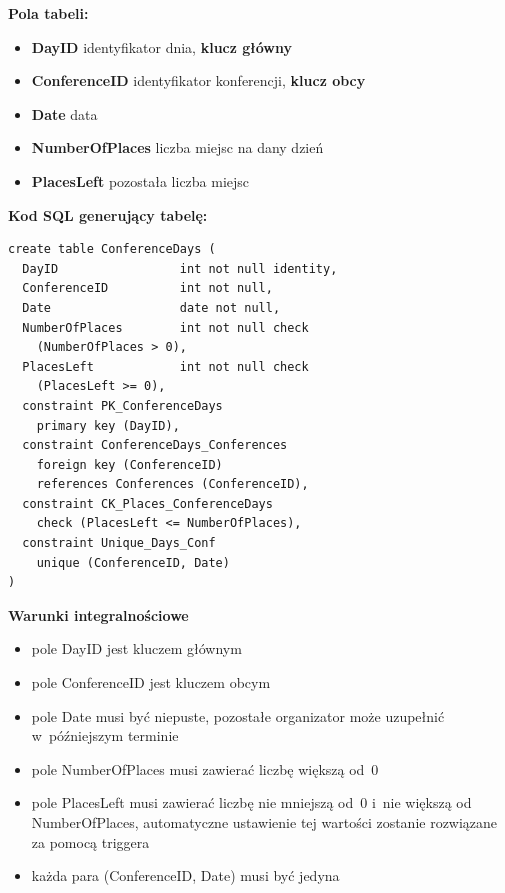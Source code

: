 \documentclass[12pt, a4paper]{mwrep}
\begin{document}
\vspace{0.5cm}

\noindent \textbf{Pola tabeli:}
\begin{itemize}
  \item \textbf{DayID} \ppauza identyfikator dnia, \textbf{klucz główny}
  \item \textbf{ConferenceID} \ppauza identyfikator konferencji, \textbf{klucz obcy}
  \item \textbf{Date} \ppauza data
  \item \textbf{NumberOfPlaces} \ppauza liczba miejsc na dany dzień
  \item \textbf{PlacesLeft} \ppauza pozostała liczba miejsc
\end{itemize}

\vspace{0.5cm}
\noindent \textbf{Kod SQL generujący tabelę:}

\begin{lstlisting}
create table ConferenceDays (
  DayID                 int not null identity,
  ConferenceID          int not null,
  Date                  date not null,
  NumberOfPlaces        int not null check
    (NumberOfPlaces > 0),
  PlacesLeft            int not null check
    (PlacesLeft >= 0),
  constraint PK_ConferenceDays 
    primary key (DayID),
  constraint ConferenceDays_Conferences 
    foreign key (ConferenceID) 
    references Conferences (ConferenceID),
  constraint CK_Places_ConferenceDays 
    check (PlacesLeft <= NumberOfPlaces),
  constraint Unique_Days_Conf 
    unique (ConferenceID, Date)
)
\end{lstlisting}

\vspace{0.5cm}
\noindent \textbf{Warunki integralnościowe}
\begin{itemize}
  \item pole DayID jest kluczem głównym
  \item pole ConferenceID jest kluczem obcym
  \item pole Date musi być niepuste, pozostałe organizator może uzupełnić w~późniejszym terminie
  \item pole NumberOfPlaces musi zawierać liczbę większą od~0
  \item pole PlacesLeft musi zawierać liczbę nie mniejszą od~0 i~nie większą od NumberOfPlaces, automatyczne ustawienie tej wartości zostanie rozwiązane za pomocą triggera
  \item każda para (ConferenceID, Date) musi być jedyna
\end{itemize}
\end{document}
